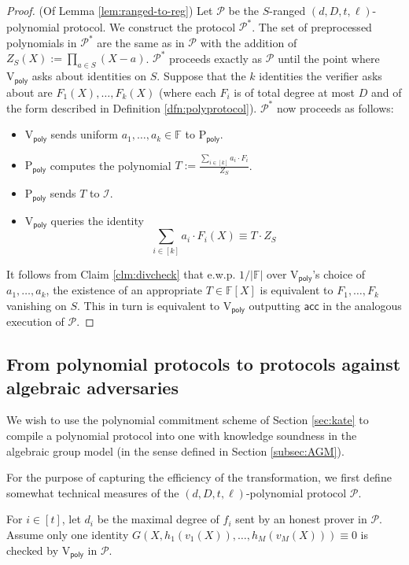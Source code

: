 \documentclass[11pt]{article} %
\newcommand{\F}{\ensuremath{\mathbb F}\xspace}
\newcommand{\polprot}[4]{$(#1,#2,#3,#4)$-polynomial protocol}
\newcommand{\rangedprot}[5]{$#5$-ranged $(#1,#2,#3,#4)$-polynomial protocol}
\newcommand{\acc}{\ensuremath{\mathsf{acc}}\xspace}
\newcommand{\defeq}{:=}
\newcommand{\prvpoly}{\ensuremath{\mathrm{P_{\mathsf{poly}}}}\xspace}
\newcommand{\verpoly}{\ensuremath{\mathrm{V_{\mathsf{poly}}}}\xspace}
\newcommand{\ideal}{\ensuremath{\mathcal{I}}\xspace}
\newcommand{\prot}{\ensuremath{\mathscr{P}}\xspace}
\newcommand{\protprime}{\ensuremath{\mathscr{P^*}}\xspace}
\begin{document}
\begin{proof}(Of Lemma \ref{lem:ranged-to-reg})
Let \prot be the \rangedprot{d}{D}{t}{\ell}{S}.
We construct the protocol \protprime.
The set of preprocessed polynomials in \protprime are the same as in \prot with the addition of $Z_S(X)\defeq \prod_{a\in S} (X-a)$.
\protprime proceeds exactly as \prot until the point where \verpoly asks about identities on $S$.
Suppose that the $k$ identities the verifier asks about are
$F_1(X),\ldots, F_k(X)$ (where each $F_i$ is of total degree at most $D$ and of the form described in Definition \ref{dfn:polyprotocol}).
\protprime now proceeds as follows:
\begin{itemize}
 \item \verpoly sends uniform $a_1,\ldots,a_k\in \F$ to \prvpoly.
\item \prvpoly computes the polynomial $T\defeq \frac{\sum_{i\in [k]}{a_i\cdot F_i}}{Z_S}$.
\item \prvpoly sends $T$ to \ideal.
\item \verpoly queries the identity
\[\sum_{i\in [k]} a_i\cdot F_i(X) \equiv T\cdot Z_S\]
 \end{itemize}
 
 It follows from Claim \ref{clm:divcheck} that e.w.p. $1/|\F|$ over \verpoly's choice of $a_1,\ldots,a_k$, the existence of an appropriate $T\in \F[X]$ is equivalent to $F_1,\ldots,F_k$ vanishing on $S$.
 This in turn is equivalent to \verpoly outputting \acc in the analogous execution of \prot.
\end{proof}


\subsection{From polynomial protocols to protocols against algebraic adversaries}\label{subsec:ideal-AGM}
We wish to use the polynomial commitment scheme of Section \ref{sec:kate} to compile a polynomial protocol into one with knowledge soundness in the algebraic group model (in the sense defined in Section \ref{subsec:AGM}).


For the purpose of capturing the efficiency of the transformation, we first define somewhat technical measures of the  \polprot{d}{D}{t}{\ell} \prot.




For $i\in [t]$, let $d_i$ be the maximal degree of $f_i$ sent by an honest prover in \prot.
Assume only one identity 
$G(X, h_1(v_1(X)),\ldots,h_M(v_M(X)))\equiv 0$
is checked by \verpoly in \prot.
\end{document}
